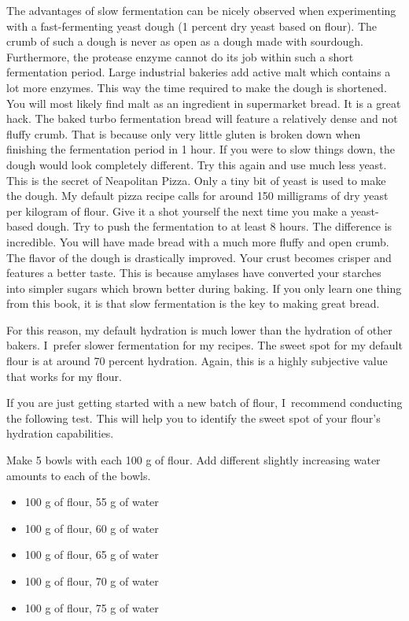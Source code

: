 The advantages of slow fermentation can be nicely observed when experimenting
with a fast-fermenting yeast dough (1 percent dry yeast based on flour). The
crumb of such a dough is never as
open as a dough made with sourdough. Furthermore, the protease enzyme
cannot do its job within such a short fermentation period.
Large industrial bakeries add active malt which contains a
lot more enzymes. This way the time required to make the dough is shortened. You
will most likely find malt as an ingredient in supermarket bread. It is a
great hack. The baked turbo fermentation bread will feature a relatively dense
and not fluffy crumb. That is because only very little gluten is broken down when
finishing the fermentation period in 1 hour. If you were to slow things down,
the dough would look completely different.
Try this again and use much less yeast. This is the
secret of Neapolitan Pizza. Only a tiny bit of yeast is used to make the
dough. My default pizza recipe calls for around 150 milligrams of dry
yeast per kilogram of flour. Give it a shot yourself the next time you
make a yeast-based dough. Try to push the fermentation to at least 8 hours.
The difference is incredible. You will have made bread with a much more
fluffy and open crumb. The flavor of the dough is drastically improved. Your
crust becomes crisper and features a better taste. This is because amylases have
converted your starches into simpler sugars which brown better during baking.
If you only learn one thing from this book, it is that slow fermentation is
the key to making great bread.

For this reason, my default hydration is much lower than the hydration of other
bakers. I~prefer slower fermentation for my recipes.
The sweet spot for my default flour is at around 70 percent hydration.
Again, this is a highly subjective value that works for my flour.

If you are just getting started with a new batch of flour,
I~recommend conducting the following test. This will help you to
identify the sweet spot of your flour's hydration capabilities.

Make 5 bowls with each 100 g of flour. Add different slightly increasing
water amounts to each of the bowls.

\begin{itemize}
  \item 100 g of flour, 55 g of water
  \item 100 g of flour, 60 g of water
  \item 100 g of flour, 65 g of water
  \item 100 g of flour, 70 g of water
  \item 100 g of flour, 75 g of water
\end{itemize}

